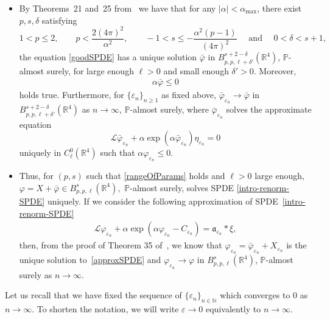 \documentclass{article}
\newcommand{\infixand}{\text{ and }}
\newenvironment{itemizedot}{\begin{itemize} \renewcommand{\labelitemi}{$\bullet$}\renewcommand{\labelitemii}{$\bullet$}\renewcommand{\labelitemiii}{$\bullet$}\renewcommand{\labelitemiv}{$\bullet$}}{\end{itemize}}
\begin{document}
\begin{itemizedot}
  \item By Theorems~21 and~25 from~{\cite{AVG2021}} we have that for any $|
  \alpha | < \alpha_{\max}$, there exist $p, s, \delta$ satisfying
  \begin{equation}
    1 < p \leqslant 2, \qquad p < \frac{2 (4 \pi)^2}{\alpha^2}, \qquad - 1 < s \leqslant -
    \frac{\alpha^2 (p - 1)}{(4 \pi)^2}  \quad \infixand \quad 0 < \delta < s + 1,
    \label{rangeOfParams}
  \end{equation}
  the equation \eqref{goodSPDE} has a unique solution $\bar{\varphi}$ in
  $B_{p, p, \ell + \delta'}^{s + 2 - \delta} (\mathbb{R}^4)$, $\mathbb{P}$-almost surely,
  for large enough $\ell > 0$ and small enough $\delta' > 0$. Moreover,
  \begin{equation}
    \begin{array}{l}
      \alpha \bar{\varphi} \leqslant 0
    \end{array} \label{neg-phi-bar}
  \end{equation}
  holds true. Furthermore, for $\{ \varepsilon_n \}_{n \geqslant 1}$ as fixed
  above, $\bar{\varphi}_{\varepsilon_n} \rightarrow \bar{\varphi} $ in $B_{p,
  p, \ell + \delta'}^{s + 2 - \delta} (\mathbb{R}^4)$ as $n \rightarrow
  \infty$, $\mathbb{P}$-almost surely, where $\bar{\varphi}_{\varepsilon_n}$ solves the
  approximate equation
  \begin{equation}
    \mathcal{L} \bar{\varphi}_{\varepsilon_n} + \alpha \exp (\alpha
    \bar{\varphi}_{\varepsilon_n}) \eta_{\varepsilon_n} = 0
    \label{good-approx-SPDE}
  \end{equation}
  uniquely in $C_{\ell}^0 (\mathbb{R}^4)$ such that $\alpha
  \varphi_{\varepsilon_n} \leqslant 0$.
  
  \item Thus, for $(p, s)$ such that \eqref{rangeOfParams} holds and $\ell >
  0$ large enough, $\varphi = X + \bar{\varphi} \in B_{p, p, \ell}^s
  (\mathbb{R}^4),$ $\mathbb{P}$-almost surely, solves SPDE \eqref{intro-renorm-SPDE}
  uniquely. If we consider the following approximation of
  SPDE~\eqref{intro-renorm-SPDE}
  \begin{equation}
    \begin{array}{l}
      \mathcal{L} \varphi_{\varepsilon_n} + \alpha \exp (\alpha
      \varphi_{\varepsilon_n} - C_{\varepsilon_n})
      =\mathfrak{a}_{\varepsilon_n} \ast \xi,
    \end{array} \label{approxSPDE}
  \end{equation}
  then, from the proof of Theorem 35 of~{\cite{AVG2021}}, we know that
  $\varphi_{\varepsilon_n} = \bar{\varphi}_{\varepsilon_n} +
  X_{\varepsilon_n}$ is the unique solution to~\eqref{approxSPDE} and
  $\varphi_{\varepsilon_n} \rightarrow \varphi$ in $B_{p, p, \ell}^s
  (\mathbb{R}^4)$, $\mathbb{P}$-almost surely as $n \rightarrow \infty$. 
\end{itemizedot}
Let us recall that we have fixed the sequence of $\{ \varepsilon_n \}_{n \in
\mathbb{N}}$ which converges to $0$ as $n \rightarrow \infty$. To shorten the
notation, we will write $\varepsilon \rightarrow 0$ equivalently to $n
\rightarrow \infty$.
\end{document}
